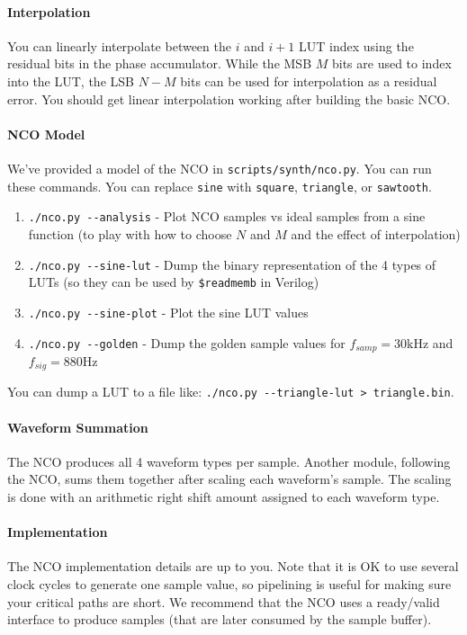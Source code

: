 \documentclass[11pt]{article}
\begin{document}
\paragraph{Interpolation}
You can linearly interpolate between the $i$ and $i+1$ LUT index using the residual bits in the phase accumulator.
While the MSB $M$ bits are used to index into the LUT, the LSB $N-M$ bits can be used for interpolation as a residual error.
You should get linear interpolation working after building the basic NCO.

\paragraph{NCO Model}
We've provided a model of the NCO in \verb|scripts/synth/nco.py|.
You can run these commands.
You can replace \verb|sine| with \verb|square|, \verb|triangle|, or \verb|sawtooth|.
\begin{enumerate}
  \item \verb|./nco.py --analysis| - Plot NCO samples vs ideal samples from a sine function (to play with how to choose $N$ and $M$ and the effect of interpolation)
  \item \verb|./nco.py --sine-lut| - Dump the binary representation of the 4 types of LUTs (so they can be used by \verb|$readmemb| in Verilog)
  \item \verb|./nco.py --sine-plot| - Plot the sine LUT values
  \item \verb|./nco.py --golden| - Dump the golden sample values for $f_{samp} = 30 \text{kHz}$ and $f_{sig} = 880 \text{Hz}$
\end{enumerate}

You can dump a LUT to a file like: \verb|./nco.py --triangle-lut > triangle.bin|.

\paragraph{Waveform Summation}
The NCO produces all 4 waveform types per sample.
Another module, following the NCO, sums them together after scaling each waveform's sample.
The scaling is done with an arithmetic right shift amount assigned to each waveform type.

\paragraph{Implementation}
The NCO implementation details are up to you.
Note that it is OK to use several clock cycles to generate one sample value, so pipelining is useful for making sure your critical paths are short.
We recommend that the NCO uses a ready/valid interface to produce samples (that are later consumed by the sample buffer).
\end{document}

